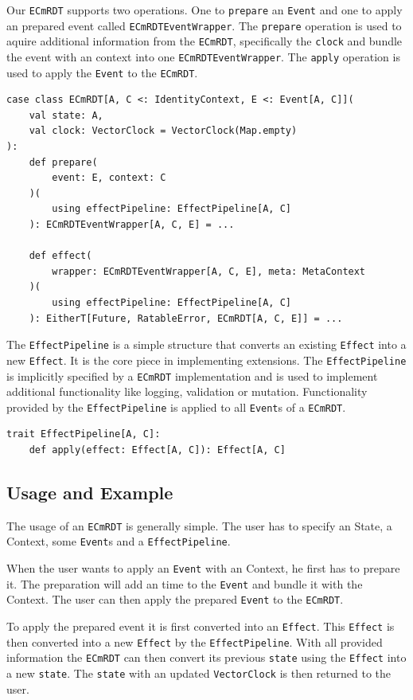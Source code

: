 \documentclass[
	ngerman,
	ruledheaders=section,   %
	class=report,		    %
	thesis={type=bachelor}, %
	accentcolor=9c,			%
	custommargins=false,    %
	marginpar=false,        %
	parskip=half-,          %
	fontsize=11pt,          %
]{tudapub}
\let\code\texttt
\begin{document}
Our \code{ECmRDT} supports two operations. One to \code{prepare} an \code{Event} and one to apply an prepared event called \code{ECmRDTEventWrapper}. The \code{prepare} operation is used to aquire additional information from the \code{ECmRDT}, specifically the \code{clock} and bundle the event with an context into one \code{ECmRDTEventWrapper}. The \code{apply} operation is used to apply the \code{Event} to the \code{ECmRDT}.

\begin{lstlisting}
case class ECmRDT[A, C <: IdentityContext, E <: Event[A, C]](
	val state: A,
	val clock: VectorClock = VectorClock(Map.empty)
):
	def prepare(
		event: E, context: C
	)(
		using effectPipeline: EffectPipeline[A, C]
	): ECmRDTEventWrapper[A, C, E] = ...

	def effect(
		wrapper: ECmRDTEventWrapper[A, C, E], meta: MetaContext
	)(
		using effectPipeline: EffectPipeline[A, C]
	): EitherT[Future, RatableError, ECmRDT[A, C, E]] = ...
\end{lstlisting}

The \code{EffectPipeline} is a simple structure that converts an existing \code{Effect} into a new \code{Effect}. It is the core piece in implementing extensions. The \code{EffectPipeline} is implicitly specified by a \code{ECmRDT} implementation and is used to implement additional functionality like logging, validation or mutation. Functionality provided by the \code{EffectPipeline} is applied to all \code{Event}s of a \code{ECmRDT}.

\begin{lstlisting}
trait EffectPipeline[A, C]:
	def apply(effect: Effect[A, C]): Effect[A, C]
\end{lstlisting}

\subsection{Usage and Example}
The usage of an \code{ECmRDT} is generally simple. The user has to specify an State, a Context, some \code{Event}s and a \code{EffectPipeline}. 

When the user wants to apply an \code{Event} with an Context, he first has to prepare it. The preparation will add an time to the \code{Event} and bundle it with the Context. The user can then apply the prepared \code{Event} to the \code{ECmRDT}. 

To apply the prepared event it is first converted into an \code{Effect}. This \code{Effect} is then converted into a new \code{Effect} by the \code{EffectPipeline}. With all provided information the \code{ECmRDT} can then convert its previous \code{state} using the \code{Effect} into a new \code{state}. The \code{state} with an updated \code{VectorClock} is then returned to the user.
\end{document}
